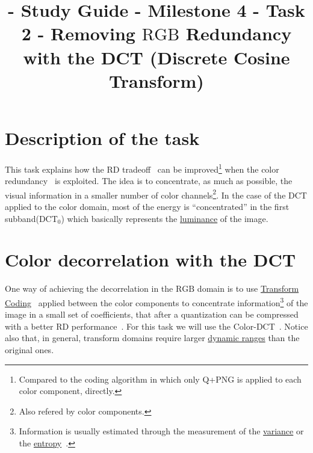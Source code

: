 

\title{\SM{} - Study Guide - Milestone 4 - Task 2 - Removing $\text{RGB}$ Redundancy with the DCT (Discrete Cosine Transform)}

\maketitle

\tableofcontents

\section{Description of the task}

This task explains how the RD
tradeoff~\cite{vruiz__information_theory} can be
improved\footnote{Compared to the coding algorithm in which only Q+PNG
is applied to each color component, directly.} when the color
redundancy~\cite{vruiz__visual_redundancy} is exploited. The idea is
to concentrate, as much as possible, the visual information in a
smaller number of color channels\footnote{Also refered by color
components.}. In the case of the DCT applied to the color domain, most
of the energy is ``concentrated'' in the first subband($\text{DCT}_0$)
which basically represents the
\href{https://en.wikipedia.org/wiki/Luminance}{luminance} of the
image.



\section{Color decorrelation with the DCT}

One way of achieving the decorrelation in the $\text{RGB}$ domain is
to use
\href{https://vicente-gonzalez-ruiz.github.io/transform_coding/}{Transform
  Coding}~\cite{vruiz__transform_coding} applied between the color
components to concentrate information\footnote{Information is usually
estimated through the measurement of the
\href{https://en.wikipedia.org/wiki/Variance}{variance} or the
\href{https://en.wikipedia.org/wiki/Entropy}{entropy}~\cite{vruiz__information_theory}.}
of the image in a small set of coefficients, that after a quantization
can be compressed with a better RD
performance~\cite{vruiz__information_theory}. For this task we will
use the Color-DCT~\cite{vruiz__DCT}. Notice also that, in general,
transform domains require larger
\href{https://en.wikipedia.org/wiki/Dynamic_range}{dynamic ranges}
than the original ones.

